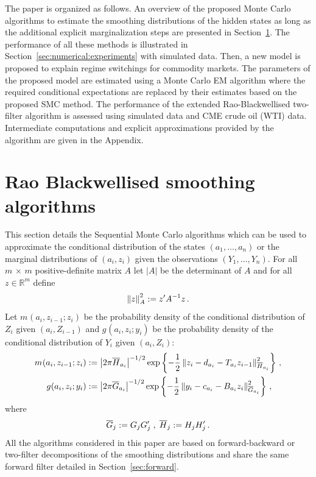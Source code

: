 The paper is organized as follows. An overview of the proposed Monte Carlo algorithms to estimate the smoothing distributions of the hidden states as long as the additional explicit marginalization steps are presented in Section~\ref{sec:RaoBlackwell}. The performance of all these methods is illustrated in Section~\ref{sec:numerical:experiments} with simulated data. Then, a new model is proposed to explain regime switchings for commodity markets. The parameters of the proposed model are estimated using a Monte Carlo EM algorithm where the required conditional expectations are replaced by their estimates based on the proposed SMC method.  
The performance of the extended Rao-Blackwellised two-filter  algorithm is assessed using simulated data and CME crude oil (WTI) data. Intermediate computations and explicit approximations provided by the algorithm are given in the Appendix.


\section{Rao Blackwellised smoothing algorithms}
\label{sec:RaoBlackwell}
This section details the Sequential Monte Carlo algorithms which can be used to approximate the conditional distribution of the states $(a_1,\ldots,a_n)$ or the marginal distributions of $(a_i,z_{i})$ given the observations $(Y_1,\ldots,Y_n)$. For all $m\,\times\,m$ positive-definite matrix $A$ let $|A|$ be the determinant of $A$ and  for all $z\in\mathbb{R}^{m}$ define
\[
\normMat{A}{z}^2 \eqdef z'A^{-1}z\eqsp.
\]
Let $m_{}(a_{i},z_{i-1};z_i)$ be the probability density of the conditional distribution of $Z_i$ given $(a_{i},Z_{i-1})$ and $g_{}(a_{i},z_{i};y_i)$ be the probability density of the conditional distribution of $Y_i$ given $(a_{i},Z_{i})$:
\begin{align}
\label{eq:definition-m}
m_{}(a_{i},z_{i-1};z_i) & \eqdef \left|2\pi\barH_{a_i}\right|^{-1/2}\exp\left\{-\frac{1}{2}\normMat{\barH_{a_i}}{z_i -d_{a_{i}} -T_{a_{i}}z_{i-1}}^2\right\}\eqsp,\\
\label{eq:definition-g}
g_{}(a_{i},z_{i};y_i) & \eqdef \left|2\pi\barG_{a_i}\right|^{-1/2}\exp\left\{-\frac{1}{2}\normMat{\barG_{a_i}}{y_i - c_{a_i} - B_{a_i}z_{i}}^2\right\}\eqsp,
\end{align}
where
\[
\barG_j \eqdef G_jG'_j\;,\; \barH_{j} \eqdef H_jH'_j\eqsp.
\]
All the algorithms considered in this paper are based on forward-backward or two-filter decompositions of the smoothing distributions and share the same forward filter detailed in Section~\ref{sec:forward}.  

